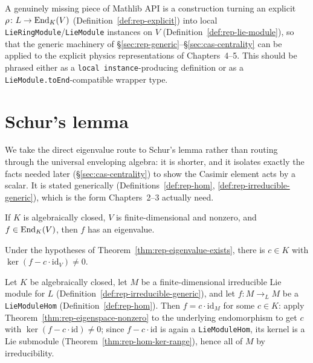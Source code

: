 \begin{remark}
  \label{def:rep-bridge}
  A genuinely missing piece of Mathlib API is a construction turning an
  explicit $\rho \colon L \to \operatorname{End}_K(V)$ (Definition~\ref{def:rep-explicit})
  into local \texttt{LieRingModule}/\texttt{LieModule} instances on $V$
  (Definition~\ref{def:rep-lie-module}), so that the generic machinery of
  \S\ref{sec:rep-generic}--\S\ref{sec:cas-centrality} can be applied to the
  explicit physics representations of Chapters~4--5. This should be phrased
  either as a \texttt{local instance}-producing definition or as a
  \texttt{LieModule.toEnd}-compatible wrapper type.
\end{remark}

\section{Schur's lemma}
\label{sec:rep-schur}

We take the direct eigenvalue route to Schur's lemma rather than routing
through the universal enveloping algebra: it is shorter, and it isolates
exactly the facts needed later (\S\ref{sec:cas-centrality}) to show the
Casimir element acts by a scalar. It is stated generically
(Definitions~\ref{def:rep-hom}, \ref{def:rep-irreducible-generic}), which is
the form Chapters~2--3 actually need.

\begin{theorem}
  \label{thm:rep-eigenvalue-exists}
  \mathlibok
  If $K$ is algebraically closed, $V$ is finite-dimensional and nonzero, and
  $f \in \operatorname{End}_K(V)$, then $f$ has an eigenvalue.
\end{theorem}

\begin{theorem}
  \label{thm:rep-eigenspace-nonzero}
  \leanok
  Under the hypotheses of Theorem~\ref{thm:rep-eigenvalue-exists}, there is
  $c \in K$ with $\ker(f - c \cdot \mathrm{id}_V) \neq 0$.
\end{theorem}

\begin{theorem}
  \label{thm:rep-schur}
  \leanok
  Let $K$ be algebraically closed, let $M$ be a finite-dimensional
  irreducible Lie module for $L$ (Definition~\ref{def:rep-irreducible-generic}),
  and let $f \colon M \to_{\!L} M$ be a \texttt{LieModuleHom}
  (Definition~\ref{def:rep-hom}). Then $f = c \cdot \mathrm{id}_M$ for some
  $c \in K$: apply Theorem~\ref{thm:rep-eigenspace-nonzero} to the underlying
  endomorphism to get $c$ with $\ker(f - c\cdot\mathrm{id}) \neq 0$; since
  $f - c\cdot\mathrm{id}$ is again a \texttt{LieModuleHom}, its kernel is a
  Lie submodule (Theorem~\ref{thm:rep-hom-ker-range}), hence all of $M$ by
  irreducibility.
\end{theorem}

